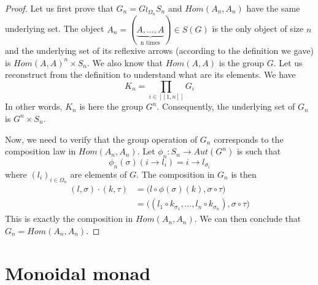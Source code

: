 \documentclass{report}
\begin{document}
\begin{proof}
    Let us first prove that $G_n = G\wr_{\Omega_n}S_n$ and $Hom(A_n,A_n)$ have the same underlying set.
    The object $A_n = (\underbrace{A,\dots,A}_\textrm{n times})\in S(G)$ is the only object of size $n$ and the underlying set of its reflexive arrows (according to the definition we gave) is $ Hom(A,A)^{n} \times S_n$. We also know that $Hom(A,A)$ is the group $G$.
    Let us reconstruct from the definition to understand what are its elements.
    We have $$K_n = \prod_{i\in [\![1,n]\!]}G_i$$
    In other words, $K_n$ is here the group $G^n$. Consequently, the underlying set of $G_n$ is $G^n\times S_n$.
    \vspace{0.5cm}

    Now, we need to verify that the group operation of $G_n$ corresponds to the composition law in $Hom(A_n,A_n)$.
    Let $\phi_n : S_n \rightarrow Aut(G^n)$ is such that $$\phi_n(\sigma)(i\rightarrow l_i) = i \rightarrow l_{\sigma_i}$$ where $(l_i)_{i\in \Omega_n}$ are elements of $G$. The composition in $G_n$ is then
    \begin{align*}
        (l,\sigma)\cdot (k,\tau) & = \big(l\circ \phi(\sigma)(k),\sigma\circ\tau\big)                                 \\
                                 & = \big((l_1 \circ k_{\sigma_1},\dots, l_n \circ k_{\sigma_n}),\sigma\circ\tau\big)
    \end{align*}
    This is exactly the composition in $Hom(A_n,A_n)$. We can then conclude that $G_n = Hom(A_n,A_n)$.

\end{proof}

\section{Monoidal monad}
\end{document}
